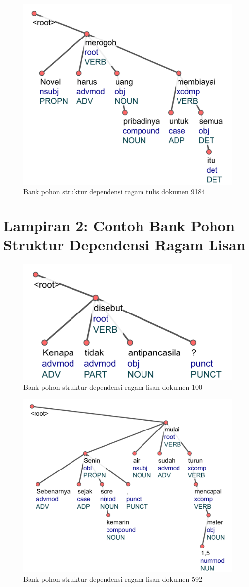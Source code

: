 \begin{figure}
	\centering \includegraphics[width=0.5
	\textwidth] {pics/lampiran/lampirants9184.jpg} 
	\caption[]{Bank pohon struktur dependensi ragam tulis dokumen 9184} 
	\label{fig:lampirants9184} 
\end{figure}


\chapter*{Lampiran 2: Contoh Bank Pohon Struktur Dependensi Ragam Lisan}

\begin{figure}
	\centering \includegraphics[width=0.4
	\textwidth] {pics/lampiran/lampiranls100.jpg} 
	\caption[]{Bank pohon struktur dependensi ragam lisan dokumen 100} 
	\label{fig:lampiranls100} 
\end{figure}

\begin{figure}
	\centering \includegraphics[width=0.6
	\textwidth] {pics/lampiran/lampiranls592.jpg} 
	\caption[]{Bank pohon struktur dependensi ragam lisan dokumen 592} 
	\label{fig:lampiranls592} 
\end{figure}

